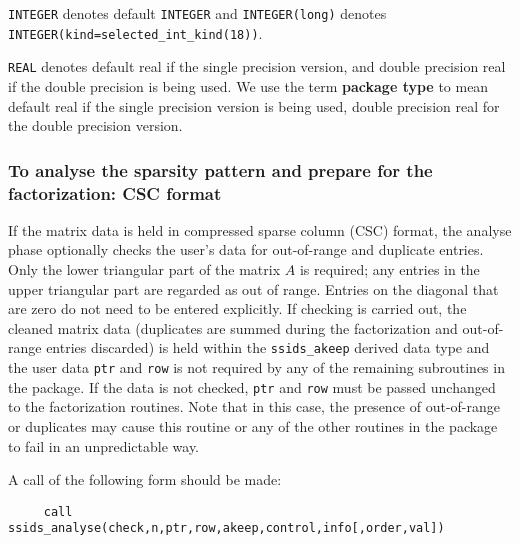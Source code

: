 \documentclass{spral}
\begin{document}
{\tt INTEGER} denotes default {\tt INTEGER} and
{\tt INTEGER(long)} denotes {\tt INTEGER(kind=selected\_int\_kind(18))}.

\noindent
{\tt REAL} denotes default real if the single precision version, and double
precision real if the double precision is being used.
We use the term {\bf package type} to mean
default real if the single precision version is being used,
double precision real for the double precision version.



\subsubsection{To analyse the sparsity pattern and prepare
for the factorization: CSC format}\label{analyse}


If the matrix data is held in compressed sparse
column (CSC) format, the analyse phase optionally checks
the user's data for out-of-range and duplicate entries.
Only the lower triangular part of the matrix $A$ is required;
any entries in the upper triangular part are regarded as  out of range.
Entries on the diagonal that are zero do not need to be entered explicitly.
If checking is carried out, the cleaned matrix data (duplicates are summed
during the factorization and out-of-range entries discarded) is
held within the {\tt ssids\_akeep} derived
data type  and the user data {\tt ptr} and {\tt row}
is not required by any of the remaining subroutines in the package.
If the data is not checked, {\tt ptr} and {\tt row}
must be passed unchanged to the factorization routines.
Note that in this case, the
presence of out-of-range or duplicates
may cause this routine or any of the other routines
in the package to fail in an unpredictable way.

\noindent
A call of the following form should be made:
\begin{verbatim}
     call ssids_analyse(check,n,ptr,row,akeep,control,info[,order,val])
\end{verbatim}
\end{document}
